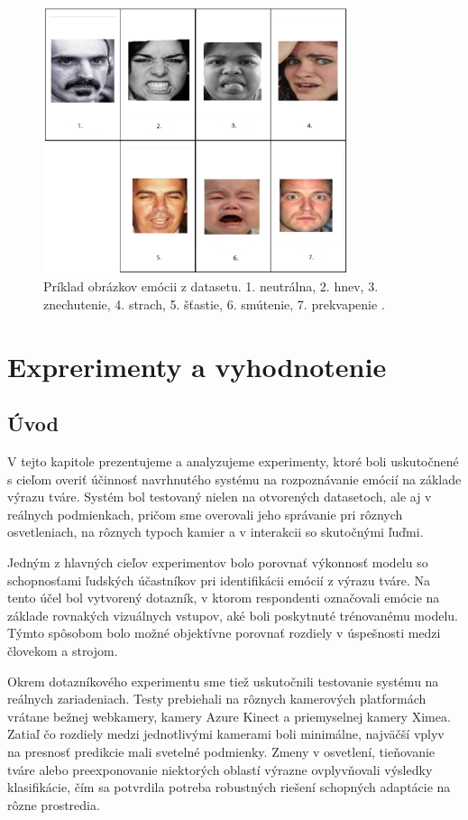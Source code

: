 \begin{figure}[!htpb]
    \centering
    \includegraphics[width=0.8\textwidth]{img/emotions_dataset.png}
    \caption{Príklad obrázkov emócii z datasetu. 1. neutrálna, 2. hnev, 3. znechutenie, 4. strach, 5. šťastie, 6. smútenie, 7. prekvapenie \cite{li2017reliable}.} 
\end{figure}


\section{Exprerimenty a vyhodnotenie}
\label{sec:experiments}
\subsection{Úvod}
V tejto kapitole prezentujeme a analyzujeme experimenty, ktoré boli uskutočnené s cieľom overiť účinnosť navrhnutého systému na rozpoznávanie emócií na základe výrazu tváre. Systém bol testovaný nielen na otvorených datasetoch, ale aj v reálnych podmienkach, pričom sme overovali jeho správanie pri rôznych osvetleniach, na rôznych typoch kamier a v interakcii so skutočnými ľuďmi.

Jedným z hlavných cieľov experimentov bolo porovnať výkonnosť modelu so schopnosťami ľudských účastníkov pri identifikácii emócií z výrazu tváre. Na tento účel bol vytvorený dotazník, v ktorom respondenti označovali emócie na základe rovnakých vizuálnych vstupov, aké boli poskytnuté trénovanému modelu. Týmto spôsobom bolo možné objektívne porovnať rozdiely v úspešnosti medzi človekom a strojom.

Okrem dotazníkového experimentu sme tiež uskutočnili testovanie systému na reálnych zariadeniach. Testy prebiehali na rôznych kamerových platformách vrátane bežnej webkamery, kamery Azure Kinect a priemyselnej kamery Ximea. Zatiaľ čo rozdiely medzi jednotlivými kamerami boli minimálne, najväčší vplyv na presnosť predikcie mali svetelné podmienky. Zmeny v osvetlení, tieňovanie tváre alebo preexponovanie niektorých oblastí výrazne ovplyvňovali výsledky klasifikácie, čím sa potvrdila potreba robustných riešení schopných adaptácie na rôzne prostredia.

